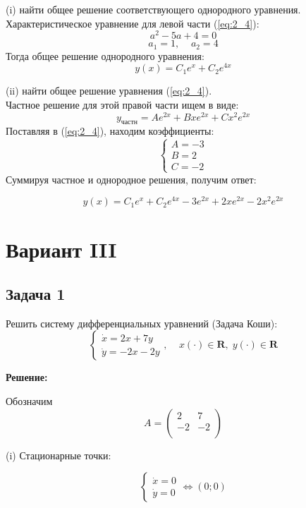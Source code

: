 \documentclass[a4paper, 12pt]{article}
\begin{document}
(i) найти общее решение соответствующего однородного уравнения.\\
Характеристическое уравнение для левой части (\ref{eq:2_4}):
\[a^2-5a+4=0\]
\[a_{1}=1,\;\;\;\; a_2 = 4\]
Тогда общее решение однородного уравнения:
\begin{equation}
y(x) = C_1e^{x}+C_2e^{4x}
\label{eq:7}
\end{equation}

(ii) найти общее решение уравнения (\ref{eq:2_4}).\\
Частное решение для этой правой части ищем в виде:
\[ y_{\text{частн}} = Ae^{2x}+Bxe^{2x}+Cx^2e^{2x}\]
Поставляя в (\ref{eq:2_4}), находим коэффициенты: 
\[
\left\{
\begin{array}{lr}
A = -3 \\
B  = 2\\
C = -2
\end{array}
\right.
\]
Суммируя частное и однородное решения, получим ответ:

\[y(x) = C_1e^{x}+C_2e^{4x}-3e^{2x} +2xe^{2x} -2x^2e^{2x} \]




	\section*{Вариант III}
		\subsection* {Задача 1}


 Решить систему дифференциальных уравнений (Задача Коши): 
\begin{equation}
\left\{
\begin{array}{lr}
\dot{x} = 2x+7y\\
\dot{y} = -2x-2y
\end{array}
\right.
, \;\;\;\; x(\cdot)\in \textbf{R},\; y(\cdot)\in \textbf{R}
\label{eq:1}
\end{equation}

\textbf{Решение:} \par
Обозначим 
\[
A = \left(
\begin{array}{cc}
2 & 7\\
-2 & -2\\
\end{array}
\right)\]

(i) Стационарные точки:

\[
\left\{
\begin{array}{lr}
\dot{x} = 0\\
\dot{y} = 0
\end{array}
\right.
\Leftrightarrow (0;0)
\]
\end{document}
